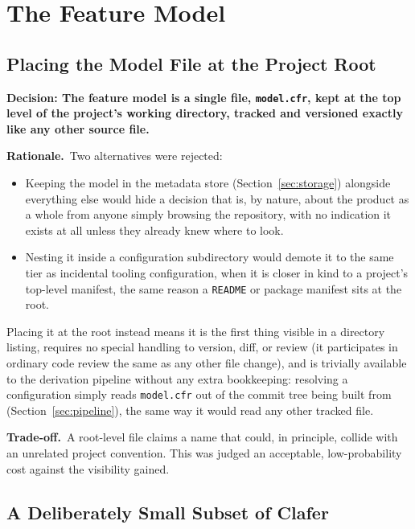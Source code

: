 \documentclass[11pt]{article}
\newcommand{\decision}[1]{\medskip\noindent\textbf{Decision: #1}\par\nopagebreak\smallskip}
\newcommand{\rationale}{\noindent\textbf{Rationale.}\ }
\newcommand{\tradeoff}{\noindent\textbf{Trade-off.}\ }
\begin{document}
\section{The Feature Model}
\label{sec:modeling}

\subsection{Placing the Model File at the Project Root}
\label{sec:model-root}

\decision{The feature model is a single file, \texttt{model.cfr}, kept at
the top level of the project's working directory, tracked and versioned
exactly like any other source file.}

\rationale Two alternatives were rejected:

\begin{itemize}[leftmargin=1.4em]
  \item Keeping the model in the metadata store (Section~\ref{sec:storage})
    alongside everything else would hide a decision that is, by nature,
    about the product as a whole from anyone simply browsing the
    repository, with no indication it exists at all unless they already
    knew where to look.
  \item Nesting it inside a configuration subdirectory would demote it to
    the same tier as incidental tooling configuration, when it is closer
    in kind to a project's top-level manifest, the same reason a
    \texttt{README} or package manifest sits at the root.
  \end{itemize}


Placing it at the root instead means it is the first thing visible in a
directory listing, requires no special handling to version, diff, or
review (it participates in ordinary code review the same as any other
file change), and is trivially available to the derivation pipeline
without any extra bookkeeping: resolving a configuration simply reads
\texttt{model.cfr} out of the commit tree being built from
(Section~\ref{sec:pipeline}), the same way it would read any other
tracked file.

\tradeoff A root-level file claims a name that could, in principle,
collide with an unrelated project convention. This was judged an
acceptable, low-probability cost against the visibility gained.

\subsection{A Deliberately Small Subset of Clafer}
\end{document}
